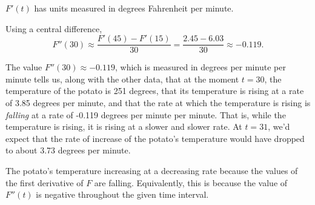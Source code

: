 \begin{activitySolution}
\ba
	\item $F'(t)$ has units measured in degrees Fahrenheit per minute. 
	\item Using a central difference, 
	$$F''(30) \approx \frac{F'(45)-F'(15)}{30} = \frac{2.45-6.03}{30} \approx -0.119.$$
	\item The value $F''(30) \approx -0.119$, which is measured in degrees per minute per minute tells us, along with the other data, that at the moment $t = 30$, the temperature of the potato is 251 degrees, that its temperature is rising at a rate of 3.85 degrees per minute, and that the rate at which the temperature is rising is \emph{falling} at a rate of -0.119 degrees per minute per minute.  That is, while the temperature is rising, it is rising at a slower and slower rate.  At $t = 31$, we'd expect that the rate of increase of the potato's temperature would have dropped to about 3.73 degrees per minute.
	\item The potato's temperature increasing at a decreasing rate because the values of the first derivative of $F$ are falling.  Equivalently, this is because the value of $F''(t)$ is negative throughout the given time interval.
\ea
\end{activitySolution}
\aftera